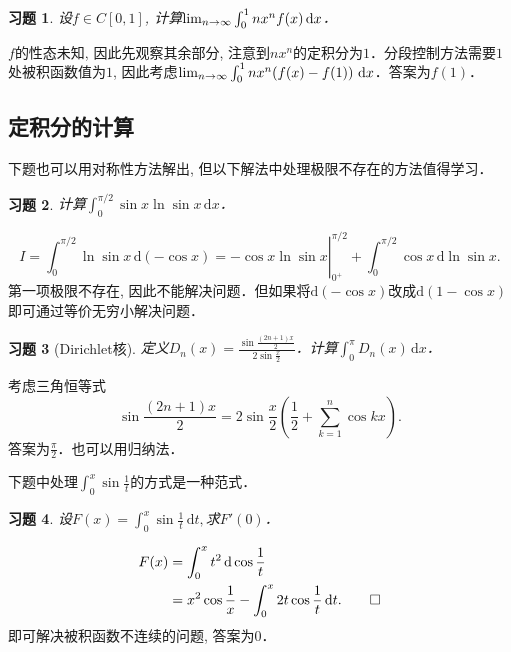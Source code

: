 \documentclass[11pt,a4paper]{ctexart}
\makeatletter
\theoremstyle{thmseries} %
\theoremstyle{exerseries}
\newtheorem{exer}{习题}[section]
\renewenvironment{proof}[1][\proofname]{\par
  \pushQED{\qed}%
  \normalfont \topsep6\p@\@plus6\p@\relax
  \trivlist
  \item[\hskip\labelsep
        \itshape
    #1\@addpunct{}]\ignorespaces
}{%
  \popQED\endtrivlist\@endpefalse
}
\newenvironment{sol}{\begin{proof}[\bfseries\upshape 解\quad]}{\end{proof}}
\newcommand{\bra}[1]{\mathopen{}\left(#1\right)}
\renewcommand{\d}{\mathrm{d}}
\def \nti {\mathnormal{n}\to\infty}
\makeatother
\begin{document}
\begin{exer}
	设$f\in C[0,1]$, 计算$\lim_{\nti}\int_{0}^{1}nx^nf(x)\,\d x$．
\end{exer}
\begin{sol}
	$f$的性态未知, 因此先观察其余部分, 注意到$nx^n$的定积分为$1$．分段控制方法需要$1$处被积函数值为$1$, 因此考虑$\lim_{\nti}\int_{0}^{1}nx^n\bra{f(x)-f(1)}\,\d x$．答案为$f(1)$．
\end{sol}


\subsection{定积分的计算}
下题也可以用对称性方法解出, 但以下解法中处理极限不存在的方法值得学习．
\begin{exer}
	计算$\int_{0}^{\pi/2}\sin x\ln\sin x\,\d x$．
\end{exer}
\begin{sol}
	\[\left.I=\int_{0}^{\pi/2}\ln\sin x\,\d(-\cos x)=-\cos x\ln\sin x\right|_{0^+}^{\pi/2}+\int_{0}^{\pi/2}\cos x\,\d\ln\sin x.\]
	第一项极限不存在, 因此不能解决问题．但如果将$\d(-\cos x)$改成$\d(1-\cos x)$即可通过等价无穷小解决问题．
\end{sol}

\begin{exer}[Dirichlet核]
	定义$D_n(x)=\frac{\sin\frac{(2n+1)x}{2}}{2\sin\frac{x}{2}}$．计算$\int_{0}^{\pi}D_n(x)\,\d x$．
\end{exer}
\begin{sol}
	考虑三角恒等式
	\[\sin\frac{(2n+1)x}{2}=2\sin\frac{x}{2}\bra{\frac{1}{2}+\sum_{k=1}^{n}\cos kx}.\]
	答案为$\frac{\pi}{2}$．也可以用归纳法．
\end{sol}


下题中处理$\int_{0}^{x}\sin\frac{1}{t}$的方式是一种范式．
\begin{exer}
	设$F(x)=\int_{0}^{x}\sin\frac{1}{t}\,\d t,$求$F'(0)$．
\end{exer}
\begin{sol}
	\begin{align*}
		F(x)&=\int_{0}^{x}t^2\,\d\cos\frac{1}{t}\\
		&=x^2\cos\frac{1}{x}-\int_{0}^{x}2t\cos\frac{1}{t}\,\d t.\qedhere
	\end{align*}
	即可解决被积函数不连续的问题, 答案为$0$．
\end{sol}
\end{document}

